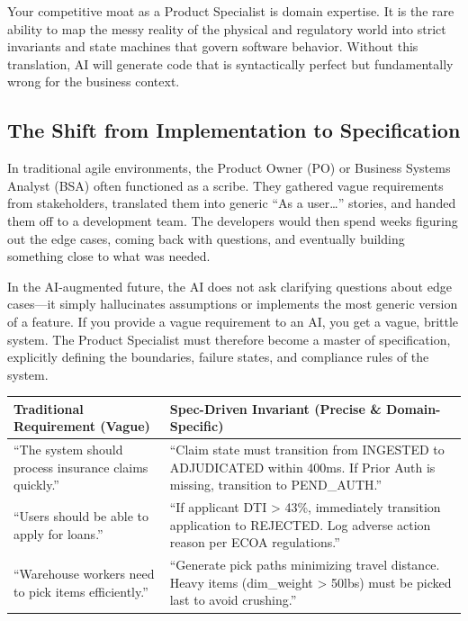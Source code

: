 \documentclass[
  11pt,
  openany,
  oneside]{book}
\begin{document}
Your competitive moat as a Product Specialist is domain expertise. It is
the rare ability to map the messy reality of the physical and regulatory
world into strict invariants and state machines that govern software
behavior. Without this translation, AI will generate code that is
syntactically perfect but fundamentally wrong for the business context.

\subsection{The Shift from Implementation to
Specification}\label{the-shift-from-implementation-to-specification}

In traditional agile environments, the Product Owner (PO) or Business
Systems Analyst (BSA) often functioned as a scribe. They gathered vague
requirements from stakeholders, translated them into generic ``As a
user\ldots{}'' stories, and handed them off to a development team. The
developers would then spend weeks figuring out the edge cases, coming
back with questions, and eventually building something close to what was
needed.

In the AI-augmented future, the AI does not ask clarifying questions
about edge cases---it simply hallucinates assumptions or implements the
most generic version of a feature. If you provide a vague requirement to
an AI, you get a vague, brittle system. The Product Specialist must
therefore become a master of specification, explicitly defining the
boundaries, failure states, and compliance rules of the system.

\begin{longtable}[]{@{}
  >{\raggedright\arraybackslash}p{}
  >{\raggedright\arraybackslash}p{}@{}}
\toprule\noalign{}
\begin{minipage}[b]{\linewidth}\raggedright
Traditional Requirement (Vague)
\end{minipage} & \begin{minipage}[b]{\linewidth}\raggedright
Spec-Driven Invariant (Precise \& Domain-Specific)
\end{minipage} \\
\midrule\noalign{}
\endhead
\bottomrule\noalign{}
\endlastfoot
``The system should process insurance claims quickly.'' & ``Claim state
must transition from INGESTED to ADJUDICATED within 400ms. If Prior Auth
is missing, transition to PEND\_AUTH.'' \\
``Users should be able to apply for loans.'' & ``If applicant DTI
\textgreater{} 43\%, immediately transition application to REJECTED. Log
adverse action reason per ECOA regulations.'' \\
``Warehouse workers need to pick items efficiently.'' & ``Generate pick
paths minimizing travel distance. Heavy items (dim\_weight
\textgreater{} 50lbs) must be picked last to avoid crushing.'' \\
\end{longtable}
\end{document}
